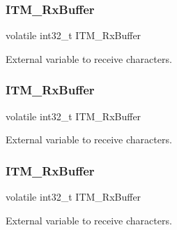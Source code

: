 \subsubsection{\texorpdfstring{ITM\_RxBuffer}{ITM\_RxBuffer}\hspace{0.1cm}{\footnotesize\ttfamily [4/6]}}
{\footnotesize\ttfamily volatile int32\+\_\+t I\+T\+M\+\_\+\+Rx\+Buffer}

External variable to receive characters. \mbox{\label{group___c_m_s_i_s__core___debug_functions_ga12e68e55a7badc271b948d6c7230b2a8}} 
\subsubsection{\texorpdfstring{ITM\_RxBuffer}{ITM\_RxBuffer}\hspace{0.1cm}{\footnotesize\ttfamily [5/6]}}
{\footnotesize\ttfamily volatile int32\+\_\+t I\+T\+M\+\_\+\+Rx\+Buffer}

External variable to receive characters. \mbox{\label{group___c_m_s_i_s__core___debug_functions_ga12e68e55a7badc271b948d6c7230b2a8}} 
\subsubsection{\texorpdfstring{ITM\_RxBuffer}{ITM\_RxBuffer}\hspace{0.1cm}{\footnotesize\ttfamily [6/6]}}
{\footnotesize\ttfamily volatile int32\+\_\+t I\+T\+M\+\_\+\+Rx\+Buffer}

External variable to receive characters. 